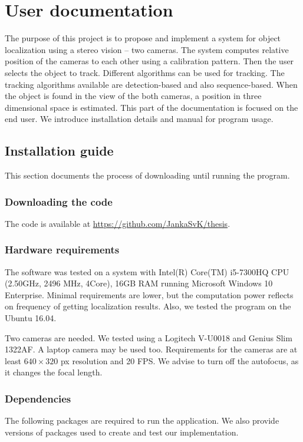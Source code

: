 \chapter{User documentation}
\label{ch:user-documentation}

The purpose of this project is to propose and implement a system for object
localization using a stereo vision -- two cameras. The system computes relative
position of the cameras to each other using a calibration pattern. Then the user
selects the object to track. Different algorithms can be used for tracking.
The tracking algorithms available are detection-based and also sequence-based.
When the object is found in the view of the both cameras, a position in three
dimensional space is estimated. 
This part of the documentation is focused on the end user. We introduce
installation details and manual for program usage.

\section{Installation guide}
This section documents the process of downloading until running the program.

\subsection{Downloading the code}
The code is available at \url{https://github.com/JankaSvK/thesis}.

\subsection{Hardware requirements}
The software was tested on a system with Intel(R) Core(TM) i5-7300HQ CPU
(2.50GHz, 2496 MHz, 4Core), 16GB RAM running Microsoft Windows 10 Enterprise.
Minimal requirements are lower, but the computation power reflects on frequency
of getting localization results. Also, we tested the program on the Ubuntu
16.04.

Two cameras are needed. We tested using a Logitech V-U0018 and Genius
Slim 1322AF. A laptop camera may be used too. Requirements for the cameras
are at least $640\times320$ px resolution and 20 FPS. We advise to turn off the
autofocus, as it changes the focal length.

\subsection{Dependencies}
The following packages are required to run the application. We also provide
versions of packages used to create and test our implementation.

